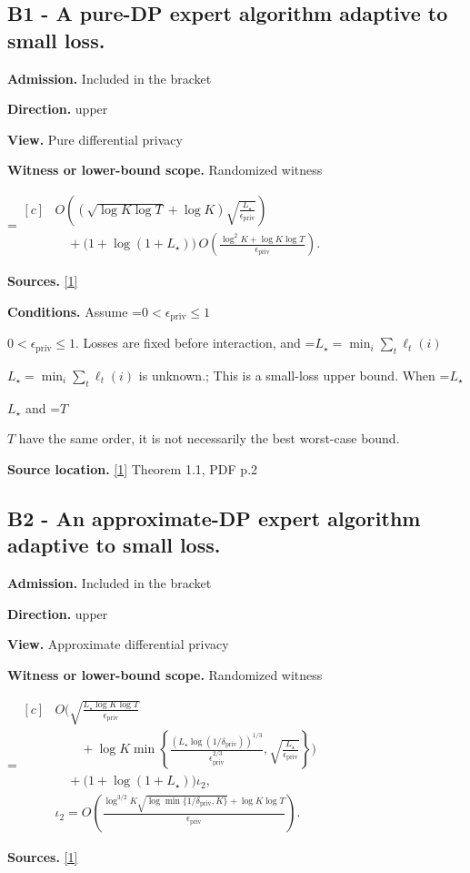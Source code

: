 \documentclass[10pt,a4paper]{article}
\newcommand{\AtlasMath}[1]{\par\begingroup\centering\setbox0=\hbox{$\displaystyle #1$}\ifdim\wd0>1.4\linewidth\typeout{ATLAS WIDE FORMULA: \the\wd0}\fi\ifdim\wd0>\linewidth\resizebox{\linewidth}{!}{\box0}\else\box0\fi\par\endgroup}
\newcommand{\AtlasInlineMath}[1]{\begingroup\setbox0=\hbox{$#1$}\ifdim\wd0>.4\linewidth\endgroup\AtlasMath{#1}\else\endgroup$#1$\fi}
\begin{document}
\subsection{B1 - A pure-DP expert algorithm adaptive to small loss.}
\textbf{Admission.} Included in the bracket

\textbf{Direction.} upper

\textbf{View.} Pure differential privacy

\textbf{Witness or lower-bound scope.} Randomized witness

\AtlasMath{\begin{aligned}[c]&O\!\left((\sqrt{\log K\log T}+\log K)\sqrt{\frac{L_\star}{\epsilon_{\mathrm{priv}}}}\right)\\ &\quad+\bigl(1+\log(1+L_\star)\bigr)\,O\!\left(\frac{\log^2K+\log K\log T}{\epsilon_{\mathrm{priv}}}\right).\end{aligned}}
\textbf{Sources.} \href{https://arxiv.org/pdf/2610.29575v2}{[1]}

\textbf{Conditions.} Assume \AtlasInlineMath{0<\epsilon_{\mathrm{priv}}\le1}. Losses are fixed before interaction, and \AtlasInlineMath{L_\star=\min_i\sum_t\ell_t(i)} is unknown.; This is a small-loss upper bound. When \AtlasInlineMath{L_\star} and \AtlasInlineMath{T} have the same order, it is not necessarily the best worst-case bound.

\textbf{Source location.} \href{https://arxiv.org/pdf/2610.29575v2}{[1]} Theorem 1.1, PDF p.2

\subsection{B2 - An approximate-DP expert algorithm adaptive to small loss.}
\textbf{Admission.} Included in the bracket

\textbf{Direction.} upper

\textbf{View.} Approximate differential privacy

\textbf{Witness or lower-bound scope.} Randomized witness

\AtlasMath{\begin{aligned}[c]&O\!\Bigg(\sqrt{\frac{L_\star\log K\log T}{\epsilon_{\mathrm{priv}}}}\\ &\qquad+\log K\min\!\left\{\frac{(L_\star\log(1/\delta_{\mathrm{priv}}))^{1/3}}{\epsilon_{\mathrm{priv}}^{2/3}},\sqrt{\frac{L_\star}{\epsilon_{\mathrm{priv}}}}\right\}\Bigg)\\ &\quad+\bigl(1+\log(1+L_\star)\bigr)\iota_2,\\ &\iota_2=O\!\left(\frac{\log^{3/2}K\sqrt{\log\min\{1/\delta_{\mathrm{priv}},K\}}+\log K\log T}{\epsilon_{\mathrm{priv}}}\right).\end{aligned}}
\textbf{Sources.} \href{https://arxiv.org/pdf/2610.29575v2}{[1]}
\end{document}
